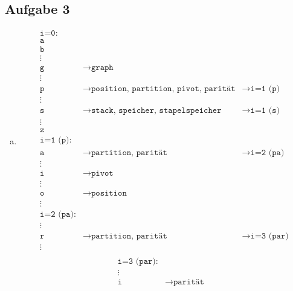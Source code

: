 \documentclass[11pt]{article}
\begin{document}
\subsection*{Aufgabe 3}
  \begin{enumerate}[a)]
    \item 
      \begin{align*}
        \texttt{i=0:} & & \\
        \texttt{a} & & \\ 
        \texttt{b} & & \\ 
        \vdots & & \\ 
        \texttt{g} & \rightarrow \texttt{graph} & \\ 
        \vdots & & \\ 
        \texttt{p} & \rightarrow \texttt{position, partition, pivot, parität}
          & \rightarrow \texttt{i=1 (p)} \\ 
        \vdots & & \\ 
        \texttt{s} & \rightarrow \texttt{stack, speicher, stapelspeicher}
          & \rightarrow \texttt{i=1 (s)} \\ 
        \vdots & & \\ 
        \texttt{z} & & \\ 
        \texttt{i=1 (p):} & & \\
        \texttt{a} & \rightarrow \texttt{partition, parität} & \rightarrow
          \texttt{i=2 (pa)} \\ 
        \vdots & & \\ 
        \texttt{i} & \rightarrow \texttt{pivot} & \\ 
        \vdots & & \\ 
        \texttt{o} & \rightarrow \texttt{position} & \\ 
        \vdots & & \\ 
        \texttt{i=2 (pa):} & & \\
        \vdots & & \\ 
        \texttt{r} & \rightarrow \texttt{partition, parität} & \rightarrow
          \texttt{i=3 (par)} \\ 
        \vdots & & \\ 
      \end{align*}
      \begin{align*}
        \texttt{i=3 (par):} & & \\
        \vdots & & \\ 
        \texttt{i} & \rightarrow \texttt{parität} & \\ 

\end{align*}
\end{enumerate}
\end{document}
